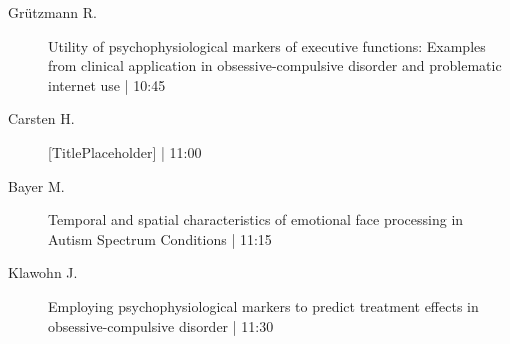 \begin{symposium}
\begin{description}
                \item [ Grützmann R.] Utility of psychophysiological markers of executive functions: Examples from clinical application in obsessive-compulsive disorder and problematic internet use \textcolor{mygray}{ | 10:45}    
                
                \item [ Carsten H.] [TitlePlaceholder] \textcolor{mygray}{ | 11:00}    
                
                \item [ Bayer M.] Temporal and spatial characteristics of emotional face processing in Autism Spectrum Conditions \textcolor{mygray}{ | 11:15}    
                
                \item [ Klawohn J.] Employing psychophysiological markers to predict treatment effects in obsessive-compulsive disorder \textcolor{mygray}{ | 11:30}    
                
            \end{description} 
            \end{symposium}
            